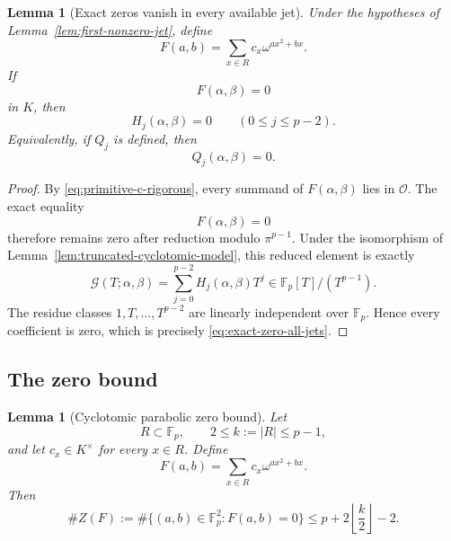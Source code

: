 \documentclass[11pt]{article}
\newtheorem{lemma}[theorem]{Lemma}
\newcommand{\F}{\mathbb F}
\begin{document}
\begin{lemma}[Exact zeros vanish in every available jet]
\label{lem:exact-zero-all-jets}
Under the hypotheses of Lemma~\ref{lem:first-nonzero-jet}, define
\[
 F(a,b)=\sum_{x\in R}c_x\omega^{a x^2+b x}.
\]
If
\[
 F(\alpha,\beta)=0
\]
in \(K\), then
\begin{equation}
 H_j(\alpha,\beta)=0
 \qquad(0\le j\le p-2).
 \label{eq:exact-zero-all-jets}
\end{equation}
Equivalently, if \(Q_j\) is defined, then
\[
 Q_j(\alpha,\beta)=0.
\]
\end{lemma}

\begin{proof}
By \eqref{eq:primitive-c-rigorous}, every summand of \(F(\alpha,\beta)\)
lies in \(\mathcal O\).  The exact equality
\[
 F(\alpha,\beta)=0
\]
therefore remains zero after reduction modulo \(\pi^{p-1}\).
Under the isomorphism of Lemma~\ref{lem:truncated-cyclotomic-model}, this
reduced element is exactly
\[
 \mathcal G(T;\alpha,\beta)
 =
 \sum_{j=0}^{p-2}H_j(\alpha,\beta)T^j
 \in\F_p[T]/(T^{p-1}).
\]
The residue classes \(1,T,\ldots,T^{p-2}\) are linearly independent
over \(\F_p\).  Hence every coefficient is zero, which is precisely
\eqref{eq:exact-zero-all-jets}.
\end{proof}

\subsection{The zero bound}

\begin{lemma}[Cyclotomic parabolic zero bound]
\label{lem:cyclotomic-zero-rigorous}
Let
\[
 R\subset\F_p,\qquad 2\le k:=|R|\le p-1,
\]
and let \(c_x\in K^\times\) for every \(x\in R\).  Define
\[
 F(a,b)=\sum_{x\in R}c_x\omega^{a x^2+b x}.
\]
Then
\begin{equation}
 \#Z(F)
 :=
 \#\{(a,b)\in\F_p^2:F(a,b)=0\}
 \le
 p+2\left\lfloor\frac{k}{2}\right\rfloor-2.
 \label{eq:cyclotomic-zero-rigorous}
\end{equation}
\end{lemma}
\end{document}
